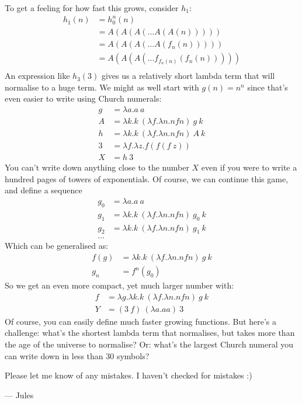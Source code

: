 To get a feeling for how fast this grows, consider $h_1$:
\begin{align*}
  h_1(n) &= h_0^n(n)\\
         &= A(A(A(\dots A(A(n)))))\\
         &= A(A(A(\dots A(f_n(n)))))\\
         &= A(A(A(\dots f_{f_n(n)}(f_n(n)))))\\
\end{align*}
An expression like $h_3(3)$ gives us a relatively short lambda term that will normalise to a huge term. We might as well start with $g(n) = n^n$ since that's even easier to write using Church numerals:
\begin{align*}
  g &= \lambda a. a\ a\\
  A &= \lambda k. k\ (\lambda f. \lambda n. n f n)\ g\ k\\
  h &= \lambda k. k\ (\lambda f. \lambda n. n f n)\ A\ k\\
  3 &= \lambda f. \lambda z. f (f (f\ z))\\
  X &= h\ 3
\end{align*}
You can't write down anything close to the number $X$ even if you were to write a hundred pages of towers of exponentials. Of course, we can continue this game, and define a sequence
\begin{align*}
  g_0 &= \lambda a. a\ a\\
  g_1 &= \lambda k. k\ (\lambda f. \lambda n. n f n)\ g_0\ k\\
  g_2 &= \lambda k. k\ (\lambda f. \lambda n. n f n)\ g_1\ k\\
  \dots
\end{align*}
Which can be generalised as:
\begin{align*}
  f(g) &= \lambda k. k\ (\lambda f. \lambda n. n f n)\ g\ k\\
  g_n &= f^n(g_0)
\end{align*}
So we get an even more compact, yet much larger number with:
\begin{align*}
  f &= \lambda g. \lambda k. k\ (\lambda f. \lambda n. n f n)\ g\ k\\
  Y &= (3\ f)\ (\lambda a. a a)\ 3
\end{align*}
Of course, you can easily define much faster growing functions. But here's a challenge: what's the shortest lambda term that normalises, but takes more than the age of the universe to normalise? Or: what's the largest Church numeral you can write down in less than 30 symbols?

Please let me know of any mistakes. I haven't checked for mistakes :)

--- Jules

